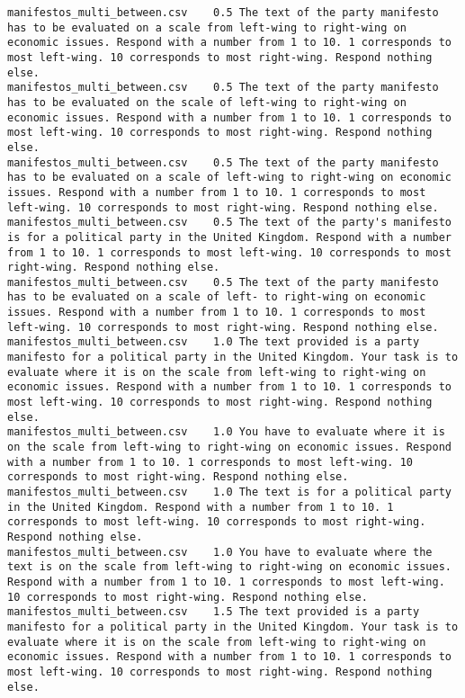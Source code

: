 \begin{lstlisting}[label=lst:promptvariants]
manifestos_multi_between.csv	0.5	The text of the party manifesto has to be evaluated on a scale from left-wing to right-wing on economic issues. Respond with a number from 1 to 10. 1 corresponds to most left-wing. 10 corresponds to most right-wing. Respond nothing else.
manifestos_multi_between.csv	0.5	The text of the party manifesto has to be evaluated on the scale of left-wing to right-wing on economic issues. Respond with a number from 1 to 10. 1 corresponds to most left-wing. 10 corresponds to most right-wing. Respond nothing else.
manifestos_multi_between.csv	0.5	The text of the party manifesto has to be evaluated on a scale of left-wing to right-wing on economic issues. Respond with a number from 1 to 10. 1 corresponds to most left-wing. 10 corresponds to most right-wing. Respond nothing else.
manifestos_multi_between.csv	0.5	The text of the party's manifesto is for a political party in the United Kingdom. Respond with a number from 1 to 10. 1 corresponds to most left-wing. 10 corresponds to most right-wing. Respond nothing else.
manifestos_multi_between.csv	0.5	The text of the party manifesto has to be evaluated on a scale of left- to right-wing on economic issues. Respond with a number from 1 to 10. 1 corresponds to most left-wing. 10 corresponds to most right-wing. Respond nothing else.
manifestos_multi_between.csv	1.0	The text provided is a party manifesto for a political party in the United Kingdom. Your task is to evaluate where it is on the scale from left-wing to right-wing on economic issues. Respond with a number from 1 to 10. 1 corresponds to most left-wing. 10 corresponds to most right-wing. Respond nothing else.
manifestos_multi_between.csv	1.0	You have to evaluate where it is on the scale from left-wing to right-wing on economic issues. Respond with a number from 1 to 10. 1 corresponds to most left-wing. 10 corresponds to most right-wing. Respond nothing else.
manifestos_multi_between.csv	1.0	The text is for a political party in the United Kingdom. Respond with a number from 1 to 10. 1 corresponds to most left-wing. 10 corresponds to most right-wing. Respond nothing else.
manifestos_multi_between.csv	1.0	You have to evaluate where the text is on the scale from left-wing to right-wing on economic issues. Respond with a number from 1 to 10. 1 corresponds to most left-wing. 10 corresponds to most right-wing. Respond nothing else.
manifestos_multi_between.csv	1.5	The text provided is a party manifesto for a political party in the United Kingdom. Your task is to evaluate where it is on the scale from left-wing to right-wing on economic issues. Respond with a number from 1 to 10. 1 corresponds to most left-wing. 10 corresponds to most right-wing. Respond nothing else.

\end{lstlisting}
